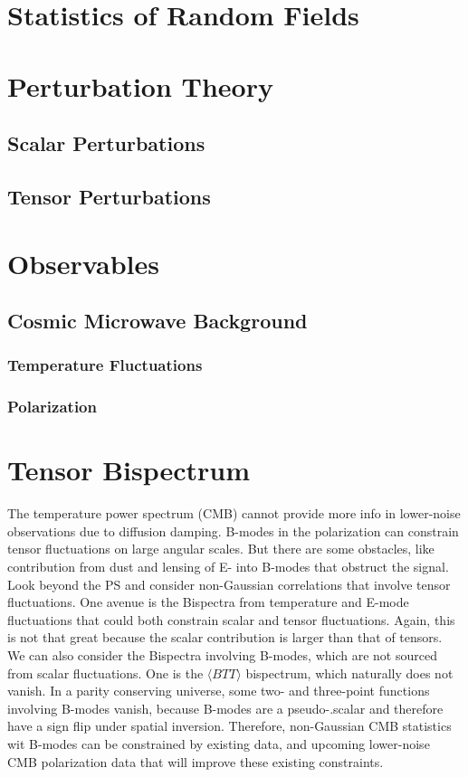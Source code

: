 \documentclass[12pt]{article}
\begin{document}
\section{Statistics of Random Fields}


\section{Perturbation Theory}

\subsection{Scalar Perturbations}

\subsection{Tensor Perturbations}

\section{Observables}

\subsection{Cosmic Microwave Background}

\subsubsection{Temperature Fluctuations}
\subsubsection{Polarization}

\section{Tensor Bispectrum}
The temperature power spectrum (CMB) cannot provide more info in lower-noise observations due to diffusion damping. B-modes in the polarization can constrain tensor fluctuations on large angular scales. But there are some obstacles, like contribution from dust and lensing of E- into B-modes that obstruct the signal. Look beyond the PS and consider non-Gaussian correlations that involve tensor fluctuations. One avenue is the Bispectra from temperature and E-mode fluctuations that could both constrain scalar and tensor fluctuations. Again, this is not that great because the scalar contribution is larger than that of tensors. We can also consider the Bispectra involving B-modes, which are not sourced from scalar fluctuations. One is the $\langle BTT \rangle$ bispectrum, which naturally does not vanish. In a parity conserving universe, some two- and three-point functions involving B-modes vanish, because B-modes are a pseudo-.scalar and therefore have a sign flip under spatial inversion. Therefore, non-Gaussian CMB statistics wit B-modes can be constrained by existing data, and upcoming lower-noise CMB polarization data that will improve these existing constraints. 
\end{document}

